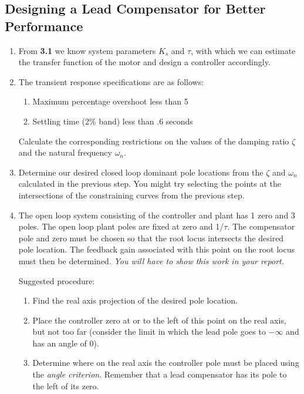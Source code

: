 \documentclass[11pt,a4paper]{article}
\begin{document}
\subsection{Designing a Lead Compensator for Better Performance}
\begin{enumerate}


\item From \textbf{3.1} we know system parameters $K_{s}$ and $\tau$, with which we can estimate the transfer function of the motor and design a controller accordingly.

\item The transient response specifications are as follows:
\begin{enumerate}
\item Maximum percentage overshoot less than 5%
\item Settling time (2\% band) less than .6 seconds
\end{enumerate}

Calculate the corresponding restrictions on the values of the damping ratio $\zeta$ and the natural frequency $\omega_{n}$.


\item Determine our desired closed loop dominant pole locations from the $\zeta$ and $\omega_{n}$ calculated in the previous step. You might try selecting the points at the intersections of the constraining curves from the previous step.

\item  The open loop system consisting of the controller and plant has 1 zero and 3 poles. The open loop plant poles are fixed at zero and 1/$\tau$. The compensator pole and zero must be chosen so that the root locus intersects the desired pole location. The feedback gain associated with this point on the root locus must then be determined. \textit{You will have to show this work in your report.}

Suggested procedure:
\begin{enumerate}

\item Find the real axis projection of the desired pole location.

\item \label{step:zeropos} Place the controller zero at or to the left of this point on the real axis, but not too far (consider the limit in which the lead pole goes to $-\infty$ and has an angle of 0).

\item Determine where on the real axis the controller pole must be placed using the \textit{angle criterion}. Remember that a lead compensator has its pole to the left of its zero.


\end{enumerate}
\end{enumerate}
\end{document}
